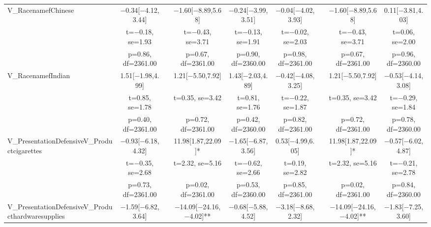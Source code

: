 \documentclass[]{report}
\begin{document}
\begin{table}
{\begin{tabular}[t]{lcccccccc}
		V\_RacenamefChinese & \num{-0.34}[\num{-4.12},\num{3.44}] &  & \num{-1.60}[\num{-8.89},\num{5.68}] & \num{-0.24}[\num{-3.99},\num{3.51}] & \num{-0.04}[\num{-4.02},\num{3.93}] &  & \num{-1.60}[\num{-8.89},\num{5.68}] & \num{0.11}[\num{-3.81},\num{4.03}]\\
		& t=\num{-0.18}, se=\num{1.93} &  & t=\num{-0.43}, se=\num{3.71} & t=\num{-0.13}, se=\num{1.91} & t=\num{-0.02}, se=\num{2.03} &  & t=\num{-0.43}, se=\num{3.71} & t=\num{0.06}, se=\num{2.00}\\
		& p=\num{0.86}, df=\num{2361.00} &  & p=\num{0.67}, df=\num{2361.00} & p=\num{0.90}, df=\num{2360.00} & p=\num{0.98}, df=\num{2361.00} &  & p=\num{0.67}, df=\num{2361.00} & p=\num{0.96}, df=\num{2360.00}\\
		V\_RacenamefIndian & \num{1.51}[\num{-1.98},\num{4.99}] &  & \num{1.21}[\num{-5.50},\num{7.92}] & \num{1.43}[\num{-2.03},\num{4.89}] & \num{-0.42}[\num{-4.08},\num{3.25}] &  & \num{1.21}[\num{-5.50},\num{7.92}] & \num{-0.53}[\num{-4.14},\num{3.08}]\\
		& t=\num{0.85}, se=\num{1.78} &  & t=\num{0.35}, se=\num{3.42} & t=\num{0.81}, se=\num{1.76} & t=\num{-0.22}, se=\num{1.87} &  & t=\num{0.35}, se=\num{3.42} & t=\num{-0.29}, se=\num{1.84}\\
		& p=\num{0.40}, df=\num{2361.00} &  & p=\num{0.72}, df=\num{2361.00} & p=\num{0.42}, df=\num{2360.00} & p=\num{0.82}, df=\num{2361.00} &  & p=\num{0.72}, df=\num{2361.00} & p=\num{0.78}, df=\num{2360.00}\\
		V\_PresentationDefensiveV\_Productcigarettes & \num{-0.93}[\num{-6.18},\num{4.32}] &  & \num{11.98}[\num{1.87},\num{22.09}]* & \num{-1.65}[\num{-6.87},\num{3.56}] & \num{0.53}[\num{-4.99},\num{6.05}] &  & \num{11.98}[\num{1.87},\num{22.09}]* & \num{-0.57}[\num{-6.02},\num{4.87}]\\
		& t=\num{-0.35}, se=\num{2.68} &  & t=\num{2.32}, se=\num{5.16} & t=\num{-0.62}, se=\num{2.66} & t=\num{0.19}, se=\num{2.82} &  & t=\num{2.32}, se=\num{5.16} & t=\num{-0.21}, se=\num{2.78}\\
		& p=\num{0.73}, df=\num{2361.00} &  & p=\num{0.02}, df=\num{2361.00} & p=\num{0.53}, df=\num{2360.00} & p=\num{0.85}, df=\num{2361.00} &  & p=\num{0.02}, df=\num{2361.00} & p=\num{0.84}, df=\num{2360.00}\\
		V\_PresentationDefensiveV\_Producthardwaresupplies & \num{-1.59}[\num{-6.82},\num{3.64}] &  & \num{-14.09}[\num{-24.16},\num{-4.02}]** & \num{-0.68}[\num{-5.88},\num{4.52}] & \num{-3.18}[\num{-8.68},\num{2.32}] &  & \num{-14.09}[\num{-24.16},\num{-4.02}]** & \num{-1.83}[\num{-7.25},\num{3.60}]\\

\end{tabular}}
\end{table}
\end{document}
